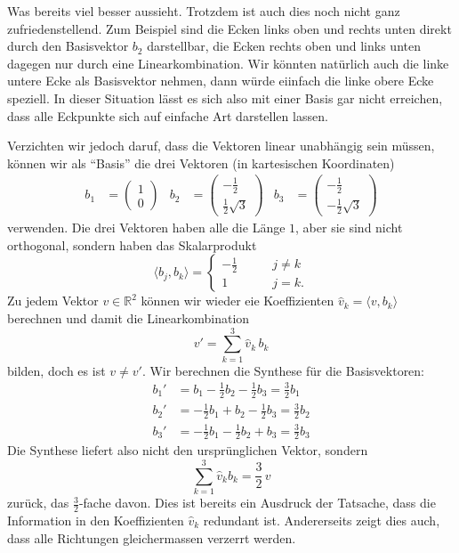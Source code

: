 Was bereits viel besser aussieht.
Trotzdem ist auch dies noch nicht ganz zufriedenstellend. 
Zum Beispiel sind die Ecken links oben und rechts unten direkt durch den
Basisvektor $b_2$ darstellbar, die Ecken rechts oben und links unten
dagegen nur durch eine Linearkombination.
Wir könnten natürlich auch die linke untere Ecke als Basisvektor nehmen,
dann würde eiinfach die linke obere Ecke speziell.
In dieser Situation lässt es sich also mit einer Basis gar nicht erreichen,
dass alle Eckpunkte sich auf einfache Art darstellen lassen.

Verzichten wir jedoch daruf, dass die Vektoren linear unabhängig sein müssen,
können wir als ``Basis'' die drei Vektoren (in kartesischen Koordinaten)
\begin{align}
b_1
&=
\begin{pmatrix}1\\0\end{pmatrix}
&
b_2
&=
\begin{pmatrix}-\frac12\\\frac12\sqrt{3}\end{pmatrix}
&
b_3
&=
\begin{pmatrix}-\frac12\\-\frac12\sqrt{3}\end{pmatrix}
\label{hexagonbasis}
\end{align}
verwenden.
Die drei Vektoren haben alle die Länge $1$, aber sie sind nicht
orthogonal, sondern haben das Skalarprodukt
\[
\langle b_j,b_k\rangle
=
\begin{cases}
-\frac12&\qquad j\ne k\\
1&\qquad j=k.
\end{cases}
\]
Zu jedem Vektor $v\in\mathbb R^2$ können wir wieder eie Koeffizienten
$\hat{v}_k=\langle v,b_k\rangle$ berechnen und damit die Linearkombination
\[
v' = \sum_{k=1}^3 \hat{v}_k\,b_k
\]
bilden,
doch es ist $v\ne v'$.
Wir berechnen die Synthese für die Basisvektoren:
\begin{align*}
b_1'
&=
b_1 - \frac12 b_2 - \frac 12 b_3
=
\frac32b_1
\\
b_2'
&=
-\frac12 b_1 + b_2 -\frac12 b_3
=
\frac32b_2
\\
b_3'
&=
-\frac12b_1-\frac12 b_2 + b_3
=
\frac32b_3
\end{align*}
Die Synthese liefert also nicht den ursprünglichen Vektor, sondern
\begin{equation}
\sum_{k=1}^3 \hat{v}_k b_k = \frac32\,v
\label{geometrie:32beispiel}
\end{equation}
zurück, das $\frac32$-fache davon.
Dies ist bereits ein Ausdruck der Tatsache, dass die Information in den
Koeffizienten $\hat{v}_k$ redundant ist.
Andererseits zeigt dies auch, dass alle Richtungen gleichermassen
verzerrt werden.

